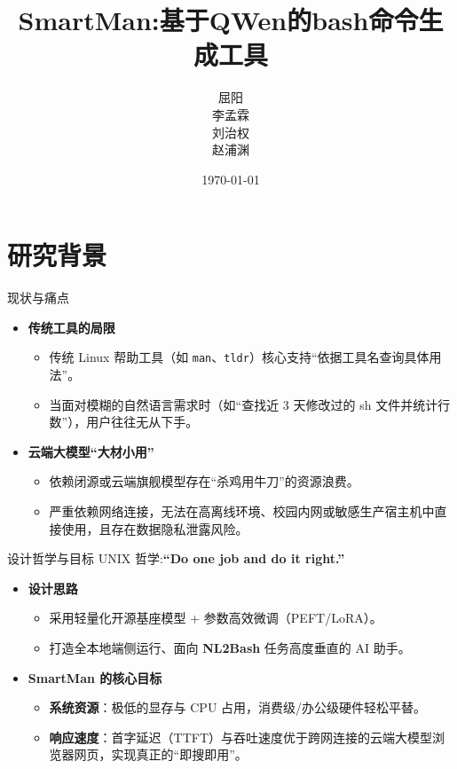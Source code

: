 \documentclass[aspectratio=169]{beamer}
\title{SmartMan:基于QWen的bash命令生成工具}
\author{屈阳\\
李孟霖\\
刘治权\\
赵浦渊}
\date{\today}
\begin{document}
\begin{frame}
  \titlepage
\end{frame}

\section{研究背景}
\begin{frame}[fragile]{现状与痛点}
  \begin{itemize}
    \item \textbf{传统工具的局限}
    \begin{itemize}
      \item 传统 Linux 帮助工具（如 \texttt{man}、\texttt{tldr}）核心支持\alert{“依据工具名查询具体用法”}。
      \item 当面对模糊的自然语言需求时（如“查找近 3 天修改过的 sh 文件并统计行数”），用户往往无从下手。
    \end{itemize}
    \vspace{0.3cm}
    \item \textbf{云端大模型“大材小用”}
    \begin{itemize}
      \item 依赖闭源或云端旗舰模型存在\alert{“杀鸡用牛刀”}的资源浪费。
      \item 严重依赖网络连接，无法在\alert{高离线环境}、\alert{校园内网}或\alert{敏感生产宿主机}中直接使用，且存在数据隐私泄露风险。
    \end{itemize}
  \end{itemize}
\end{frame}

\begin{frame}[fragile]{设计哲学与目标}
  UNIX 哲学:\textbf{“Do one job and do it right.”}

    \begin{itemize}
    \item \textbf{设计思路}
    \begin{itemize}
      \item 采用\alert{轻量化开源基座模型} + \alert{参数高效微调（PEFT/LoRA）}。
      \item 打造全本地端侧运行、面向 \textbf{NL2Bash} 任务高度垂直的 AI 助手。
    \end{itemize}
    \vspace{0.2cm}
    \item \textbf{SmartMan 的核心目标}
    \begin{itemize}
      \item \textbf{系统资源}：极低的显存与 CPU 占用，消费级/办公级硬件轻松平替。
      \item \textbf{响应速度}：首字延迟（TTFT）与吞吐速度优于跨网连接的云端大模型浏览器网页，实现真正的“即搜即用”。
    \end{itemize}
  \end{itemize}
\end{frame}
\end{document}
